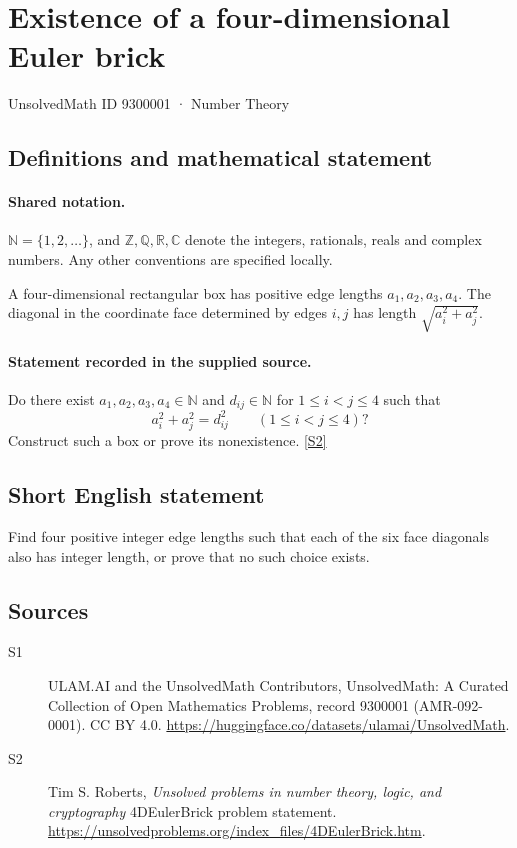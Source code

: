 \documentclass[11pt]{article}
\newcommand{\sref}[2]{\hyperlink{source:#1:#2}{[S#2]}}
\begin{document}
\setcounter{section}{9300000}
\section{Existence of a four-dimensional Euler brick}\label{9300001}
{\small\sffamily UnsolvedMath ID 9300001 · Number Theory}
\subsection{Definitions and mathematical statement}

\paragraph{Shared notation.}$\mathbb N=\{1,2,\ldots\}$, and $\mathbb Z,\mathbb Q,\mathbb R,\mathbb C$ denote the integers, rationals, reals and complex numbers. Any other conventions are specified locally.


A four-dimensional rectangular box has positive edge lengths $a_1,a_2,a_3,a_4$. The diagonal in the coordinate face determined by edges $i,j$ has length $\sqrt{a_i^2+a_j^2}$.
\paragraph{Statement recorded in the supplied source.}
Do there exist $a_1,a_2,a_3,a_4\in\mathbb N$ and $d_{ij}\in\mathbb N$ for $1\le i<j\le4$ such that
\[
a_i^2+a_j^2=d_{ij}^2\qquad(1\le i<j\le4)?
\]
Construct such a box or prove its nonexistence. \sref{9300001}{2}
\subsection{Short English statement}
Find four positive integer edge lengths such that each of the six face diagonals also has integer length, or prove that no such choice exists.
\subsection{Sources}
\begin{description}
\item[\hypertarget{source:9300001:1}{S1}] ULAM.AI and the UnsolvedMath Contributors, UnsolvedMath: A Curated Collection of Open Mathematics Problems, record 9300001 (AMR-092-0001). CC BY 4.0. \url{https://huggingface.co/datasets/ulamai/UnsolvedMath}.
\item[\hypertarget{source:9300001:2}{S2}] Tim S. Roberts, \emph{Unsolved problems in number theory, logic, and cryptography} 4DEulerBrick problem statement. \url{https://unsolvedproblems.org/index_files/4DEulerBrick.htm}.
\end{description}
\label{end:9300001}
\end{document}
